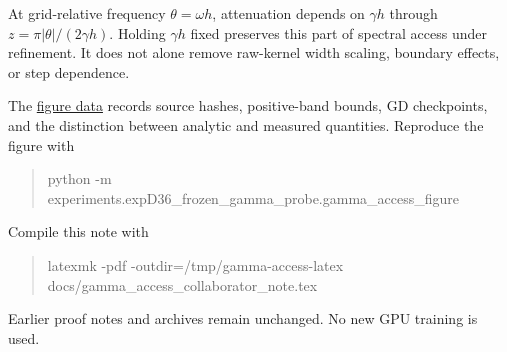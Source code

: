 \documentclass[11pt]{article}
\theoremstyle{definition}
\newcommand{\repo}{https://github.com/samlayton99/precision-mlps/blob/experiment/frozen-gamma-probe}
\newcommand{\evidence}{\repo/results/checkpoint_D_optimizers/expD36_frozen_gamma_probe/full_sweep/refinements/gamma_access_note}
\begin{document}
At grid-relative frequency $\theta=\omega h$, attenuation depends on
$\gamma h$ through $z=\pi|\theta|/(2\gamma h)$. Holding $\gamma h$ fixed
preserves this part of spectral access under refinement. It does not alone
remove raw-kernel width scaling, boundary effects, or step dependence.

The \href{\evidence/gamma_access_data.json}{figure data} records source
hashes, positive-band bounds, GD checkpoints, and the distinction between
analytic and measured quantities. Reproduce the figure with
\begin{quote}\small\ttfamily
python -m experiments.expD36\_frozen\_gamma\_probe.gamma\_access\_figure
\end{quote}
Compile this note with
\begin{quote}\small\ttfamily
latexmk -pdf -outdir=/tmp/gamma-access-latex\\
\hspace*{1em}docs/gamma\_access\_collaborator\_note.tex
\end{quote}
Earlier proof notes and archives remain unchanged. No new GPU training is used.
\end{document}
